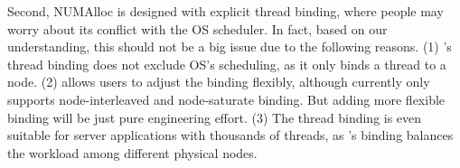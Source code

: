 Second, NUMAlloc is designed with explicit thread binding, where people may worry about its conflict with the OS scheduler. In fact, based on our understanding, this should not be a big issue due to the following reasons. (1) \NM{}'s thread binding does not exclude OS's scheduling, as it only binds a thread to a node. (2) \NM{} allows users to adjust the binding flexibly, although currently \NM{} only supports node-interleaved and node-saturate binding. But adding more flexible binding will be just pure engineering effort. (3) The thread binding is even suitable for server applications with thousands of threads, as \NM{}'s binding balances the workload among different physical nodes. 



\begin{comment}
\todo{NUMAalloc may not suitable for the situation for the system has thousands of threads. But maybe still okay, as these threads are balanced distributed to different nodes.

NUMAlloc can be useful for certain applications and system configurations and appears to be well-crafted. 

Maybe we could say that numa support is a daunting task, but it is actually not. This paper shows how to use and embedded these mechanisms in order to choose a better result. 
Interleaving shared objects similarly can make sense (e.g. as in the applications used in the evaluation of the paper) but is not easy to accept that it will universally work well or better than other techniques. As a different case from the one above, consider a server where tens-hundreds of different applications are running, possibly in containers/VMs, starting and finishing dynamically. What does interleaving shared objects say for such cases?

}

\end{comment}
